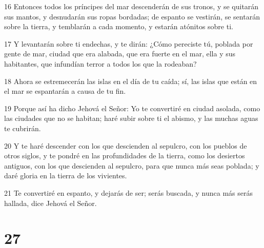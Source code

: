 \par 16 Entonces todos los príncipes del mar descenderán de sus tronos, y se quitarán sus mantos, y desnudarán sus ropas bordadas; de espanto se vestirán, se sentarán sobre la tierra, y temblarán a cada momento, y estarán atónitos sobre ti.
\par 17 Y levantarán sobre ti endechas, y te dirán: ¿Cómo pereciste tú, poblada por gente de mar, ciudad que era alabada, que era fuerte en el mar, ella y sus habitantes, que infundían terror a todos los que la rodeaban?
\par 18 Ahora se estremecerán las islas en el día de tu caída; sí, las islas que están en el mar se espantarán a causa de tu fin. 
\par 19 Porque así ha dicho Jehová el Señor: Yo te convertiré en ciudad asolada, como las ciudades que no se habitan; haré subir sobre ti el abismo, y las muchas aguas te cubrirán.
\par 20 Y te haré descender con los que descienden al sepulcro, con los pueblos de otros siglos, y te pondré en las profundidades de la tierra, como los desiertos antiguos, con los que descienden al sepulcro, para que nunca más seas poblada; y daré gloria en la tierra de los vivientes.
\par 21 Te convertiré en espanto, y dejarás de ser; serás buscada, y nunca más serás hallada, dice Jehová el Señor. 

\chapter{27}

